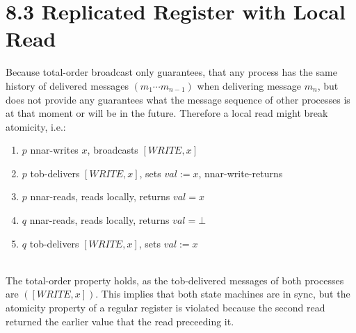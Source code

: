 \documentclass{article}
\begin{document}
	\section*{8.3 Replicated Register with Local Read}
	\begin{adjustwidth}{2em}{2em}
		Because total-order broadcast only guarantees, that any process has the same history of delivered messages $(m_1 \cdots m_{n-1})$ when delivering message $m_n$, but does not provide  any guarantees what the message sequence of other processes is at that moment or will be in the future. Therefore a local read might break atomicity, i.e.: \\
		\begin{enumerate}
			\item $p$ nnar-writes $x$, broadcasts $[WRITE, x]$
			\item $p$ tob-delivers $[WRITE, x]$, sets $val := x$, nnar-write-returns
			\item $p$ nnar-reads, reads locally, returns $val = x$
			\item $q$ nnar-reads, reads locally, returns $val = \bot$
			\item $q$ tob-delivers  $[WRITE, x]$, sets $val := x$
		\end{enumerate}
		\hfill \\
		The total-order property holds, as the tob-delivered messages of both processes
are $([WRITE, x])$. This implies that both state machines are in sync, but the atomicity property of a regular register is violated because the second read returned the earlier value that the read preceeding it.
	\end{adjustwidth}
\end{document}
